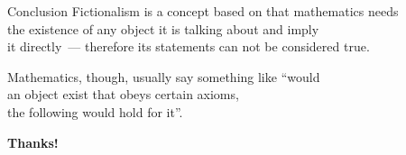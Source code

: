 \documentclass[12pt,aspectratio=169,svgnames]{beamer}
\begin{document}
\begin{frame}{Conclusion}
	Fictionalism is a concept based on that mathematics needs \\
	the existence of any object it is talking about and imply \\
	it directly~— therefore its statements can not be considered true. \bigskip

	Mathematics, though, usually say something like “would \\
	an object exist that obeys certain axioms, \\
	the following would hold for it”. \bigskip

	{\bf Thanks!}
\end{frame}
\end{document}
